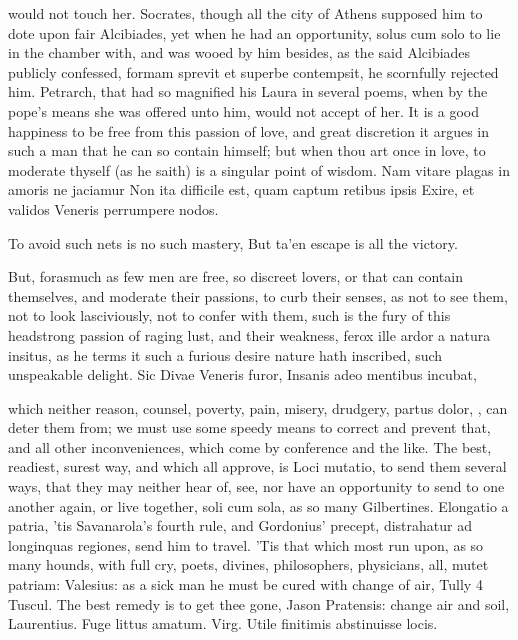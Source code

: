 {would not touch her. Socrates, though all the city of Athens supposed
him to dote upon fair Alcibiades, yet when he had an opportunity,
solus cum solo to lie in the chamber with, and was wooed by him
besides, as the said Alcibiades publicly confessed, formam
sprevit et superbe contempsit, he scornfully rejected him. Petrarch,
that had so magnified his Laura in several poems, when by the pope's
means she was offered unto him, would not accept of her. It is a
good happiness to be free from this passion of love, and great
discretion it argues in such a man that he can so contain himself; but
when thou art once in love, to moderate thyself (as he saith) is a
singular point of wisdom.
Nam vitare plagas in amoris ne jaciamur
Non ita difficile est, quam captum retibus ipsis
Exire, et validos Veneris perrumpere nodos.

To avoid such nets is no such mastery,
But ta'en escape is all the victory.

But, forasmuch as few men are free, so discreet lovers, or that can
contain themselves, and moderate their passions, to curb their senses,
as not to see them, not to look lasciviously, not to confer with them,
such is the fury of this headstrong passion of raging lust, and their
weakness, ferox ille ardor a natura insitus, as he terms it such
a furious desire nature hath inscribed, such unspeakable delight.
Sic Divae Veneris furor,
Insanis adeo mentibus incubat,

which neither reason, counsel, poverty, pain, misery, drudgery, partus
dolor, \etc{}, can deter them from; we must use some speedy means to
correct and prevent that, and all other inconveniences, which come by
conference and the like. The best, readiest, surest way, and which all
approve, is Loci mutatio, to send them several ways, that they may
neither hear of, see, nor have an opportunity to send to one another
again, or live together, soli cum sola, as so many Gilbertines.
Elongatio a patria, 'tis Savanarola's fourth rule, and Gordonius'
precept, distrahatur ad longinquas regiones, send him to travel. 'Tis
that which most run upon, as so many hounds, with full cry, poets,
divines, philosophers, physicians, all, mutet patriam: Valesius:
as a sick man he must be cured with change of air, Tully 4
Tuscul. The best remedy is to get thee gone, Jason Pratensis: change
air and soil, Laurentius. Fuge littus amatum.
Virg. Utile finitimis abstinuisse locis.

}
